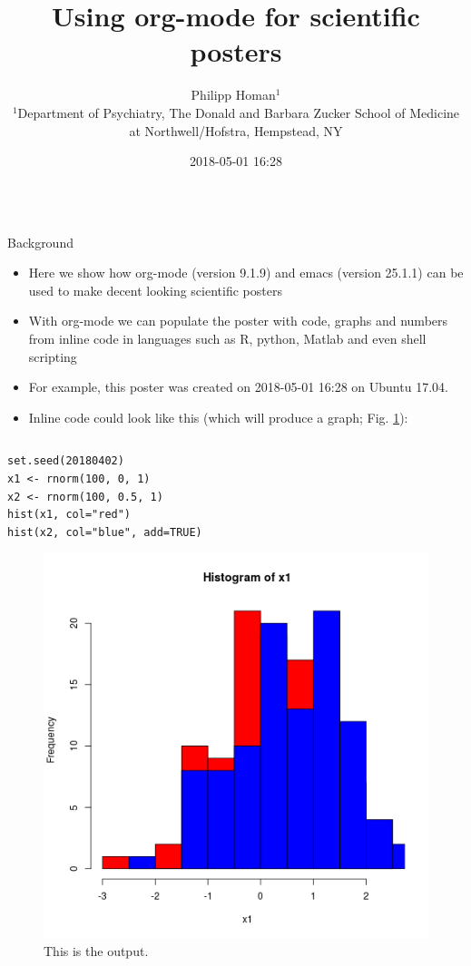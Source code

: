\documentclass[final]{beamer}
\date{}
\author{
Philipp Homan$^{1}$
\\
\normalsize{$^{1}$Department of Psychiatry,}
\normalsize{The Donald and Barbara Zucker}
\normalsize{School of Medicine at Northwell/Hofstra,}
\normalsize{Hempstead, NY}
}
\date{2018-05-01 16:28}
\title{Using org-mode for scientific posters}
\begin{document}
\begin{frame}[fragile,label={sec:org88bd8a7}]{}
 \begin{columns}
\begin{column}[t]{0.45\columnwidth}
\begin{block}{Background}
\begin{itemize}
\item Here we show how org-mode (version 
9.1.9) and emacs (version 
25.1.1) can be used to make decent looking scientific
posters
\item With org-mode we can populate the poster with code, graphs and numbers
from inline code in languages such as R, python, Matlab and even shell
scripting
\item For example, this poster was created on 2018-05-01 16:28 on
Ubuntu 17.04.
\item Inline code could look like this (which will produce a graph; 
Fig. \ref{fig:orge07790b}):
\end{itemize}

\begin{columns}
\begin{column}[T]{0.68\columnwidth}
\begin{verbatim}
set.seed(20180402)
x1 <- rnorm(100, 0, 1)
x2 <- rnorm(100, 0.5, 1)
hist(x1, col="red")
hist(x2, col="blue", add=TRUE)
\end{verbatim}

\begin{figure}[htbp]
\centering
\includegraphics[width=.9\linewidth]{3.png}
\caption{\label{fig:orge07790b}
This is the output.}
\end{figure}
\end{column}
\end{columns}
\end{block}


\end{column}
\end{columns}
\end{frame}
\end{document}

